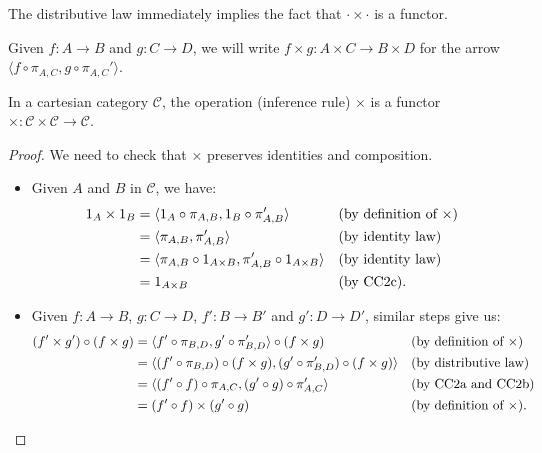 The distributive law immediately implies the fact that $\cdot \times \cdot$ is a functor.

\begin{notation}
    Given $f : A \to B$ and $g : C \to D$, we will write $f \times g : A \times C \to B \times D$ for the arrow $\langle f \circ \pi_{A,C}, g \circ \pi_{A,C}'\rangle$.
\end{notation}

\begin{corollary}
    In a cartesian category $\mathcal C$, the operation (inference rule) $\times$ is a functor $\times : \mathcal C \times \mathcal C \to \mathcal C$.
\end{corollary}

\begin{proof}
    We need to check that $\times$ preserves identities and composition.
    \begin{itemize}
        \item[$\boxed{\textnormal{identity}}$] Given $A$ and $B$ in $\mathcal C$, we have:
        \begin{align*}
            1_A \times 1_B &= \langle 1_A \circ \pi_{A,B}, 1_B \circ \pi_{A,B}'\rangle &&(\textnormal{by definition of $\times$}) \\
                           &= \langle \pi_{A,B}, \pi_{A,B}'\rangle &&(\textnormal{by identity law}) \\
                           &= \langle \pi_{A,B} \circ 1_{A \times B}, \pi_{A,B}' \circ 1_{A \times B}\rangle &&(\textnormal{by identity law}) \\
                           &= 1_{A \times B} &&(\textnormal{by CC2c}).
        \end{align*} 
        \item[$\boxed{\textnormal{composition}}$] Given $f : A \to B$, $g : C \to D$, $f' : B \to B'$ and $g' : D \to D'$, similar steps give us:
        \begin{align*}
            (f' \times g') \circ (f \times g) &= \langle f' \circ \pi_{B,D}, g' \circ \pi_{B,D}'\rangle \circ (f \times g) &&(\textnormal{by definition of $\times$}) \\
                                              &= \langle (f' \circ \pi_{B,D}) \circ (f \times g), (g' \circ \pi_{B,D}') \circ (f \times g)\rangle &&(\textnormal{by distributive law})\\
                                              &= \langle (f' \circ f) \circ \pi_{A,C}, (g' \circ g) \circ \pi_{A,C}'\rangle &&(\textnormal{by CC2a and CC2b}) \\
                                              &= (f' \circ f) \times (g' \circ g) &&(\textnormal{by definition of $\times$}).
        \end{align*}
    \end{itemize}
\end{proof}

